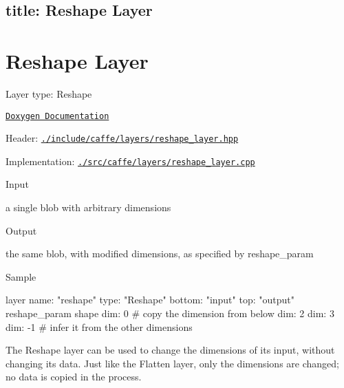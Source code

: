 

 \subsection*{title\+: Reshape Layer }

\section*{Reshape Layer}


\begin{DoxyItemize}
\item Layer type\+: {\ttfamily Reshape}
\item \href{http://caffe.berkeleyvision.org/doxygen/classcaffe_1_1ReshapeLayer.html}{\tt Doxygen Documentation}
\item Header\+: \href{https://github.com/BVLC/caffe/blob/master/include/caffe/layers/reshape_layer.hpp}{\tt {\ttfamily ./include/caffe/layers/reshape\+\_\+layer.hpp}}
\item Implementation\+: \href{https://github.com/BVLC/caffe/blob/master/src/caffe/layers/reshape_layer.cpp}{\tt {\ttfamily ./src/caffe/layers/reshape\+\_\+layer.cpp}}
\item Input
\begin{DoxyItemize}
\item a single blob with arbitrary dimensions
\end{DoxyItemize}
\item Output
\begin{DoxyItemize}
\item the same blob, with modified dimensions, as specified by {\ttfamily reshape\+\_\+param}
\end{DoxyItemize}
\item Sample \begin{DoxyVerb}  layer {
    name: "reshape"
    type: "Reshape"
    bottom: "input"
    top: "output"
    reshape_param {
      shape {
        dim: 0  # copy the dimension from below
        dim: 2
        dim: 3
        dim: -1 # infer it from the other dimensions
      }
    }
  }
\end{DoxyVerb}

\end{DoxyItemize}

The {\ttfamily Reshape} layer can be used to change the dimensions of its input, without changing its data. Just like the {\ttfamily Flatten} layer, only the dimensions are changed; no data is copied in the process.


